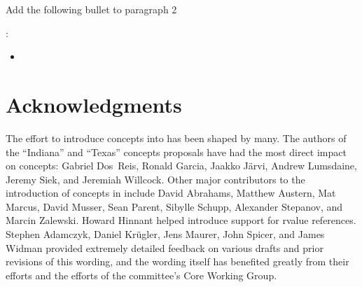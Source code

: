 \documentclass[american]{book}
\newcommand{\editorial}[1]{\colorbox{editbackground}{\begin{minipage}{\linewidth
}#1\end{minipage}}}
\begin{document}
\begin{paras}

\editorial{Add the following bullet to paragraph 2}:
\begin{itemize}
\item%
\end{itemize}
\end{paras}

\section*{Acknowledgments}
The effort to introduce concepts into \Cpp{} has been shaped by
many. The authors of the ``Indiana'' and ``Texas'' concepts proposals
have had the most direct impact on concepts: Gabriel Dos~Reis, Ronald
Garcia, Jaakko J\"arvi, Andrew Lumsdaine, Jeremy Siek, and Jeremiah
Willcock. Other major contributors to the introduction of concepts in
\Cpp{} include David Abrahams, Matthew Austern, Mat Marcus, David
Musser, Sean Parent, Sibylle Schupp, Alexander Stepanov, and Marcin
Zalewski.
%
Howard Hinnant helped introduce support for rvalue references.
%
Stephen Adamczyk, Daniel Kr\"ugler, Jens Maurer, John Spicer, and James
Widman provided extremely
detailed feedback on various drafts and prior revisions of this
wording, and the wording itself has benefited greatly from their
efforts and the efforts of the \Cpp{} committee's Core Working Group. 



\end{document}
